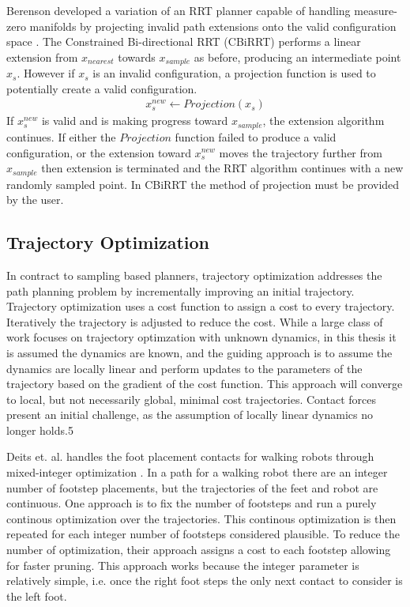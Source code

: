 \documentclass[../thesis.tex]{subfiles}
\begin{document}
Berenson developed a variation of an RRT planner capable of handling measure-zero manifolds by projecting invalid path extensions onto the valid configuration space \cite{Berenson2009a}.
The Constrained Bi-directional RRT (CBiRRT) performs a linear extension from $x_{nearest}$ towards $x_{sample}$ as before, producing an intermediate point $x_s$.
However if $x_s$ is an invalid configuration, a projection function is used to potentially create a valid configuration.
\begin{align}
  x_s^{new} \leftarrow Projection(x_s)
\end{align}
If $x_s^{new}$ is valid and is making progress toward $x_{sample}$, the extension algorithm continues.
If either the $Projection$ function failed to produce a valid configuration, or the extension toward $x_s^{new}$ moves the trajectory further from $x_{sample}$ then extension is terminated and the RRT algorithm continues with a new randomly sampled point.
In CBiRRT the method of projection must be provided by the user. 




\subsection{Trajectory Optimization}
In contract to sampling based planners, trajectory optimization addresses the path planning problem by incrementally improving an initial trajectory.
Trajectory optimization uses a cost function to assign a cost to every trajectory.
Iteratively the trajectory is adjusted to reduce the cost.
While a large class of work focuses on trajectory optimzation with unknown dynamics, in this thesis it is assumed the dynamics are known, and the guiding approach is to assume the dynamics are locally linear and perform updates to the parameters of the trajectory based on the gradient of the cost function.
This approach will converge to local, but not necessarily global, minimal cost trajectories.
Contact forces present an initial challenge, as the assumption of locally linear dynamics no longer holds.5

Deits et. al. handles the foot placement contacts for walking robots through mixed-integer optimization \cite{Deits2015}.
In a path for a walking robot there are an integer number of footstep placements, but the trajectories of the feet and robot are continuous.
One approach is to fix the number of footsteps and run a purely continous optimization over the trajectories.
This continous optimization is then repeated for each integer number of footsteps considered plausible.
To reduce the number of optimization, their approach assigns a cost to each footstep allowing for faster pruning.
This approach works because the integer parameter is relatively simple, i.e. once the right foot steps the only next contact to consider is the left foot.
\end{document}
